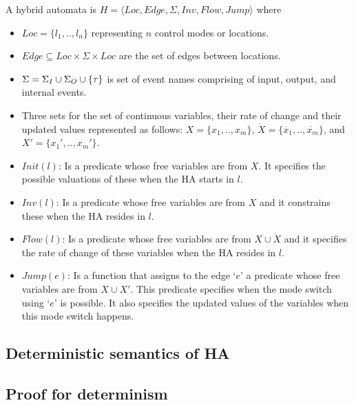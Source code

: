 \begin{definition}
	A hybrid automata is \newline 
	$H = \langle Loc, Edge, \Sigma, Inv, Flow, Jump \rangle$ where
	\begin{itemize}
		\item $Loc=\{l_1,..,l_n\}$ representing $n$ control modes or
		locations.
		\item $Edge \subseteq Loc \times \Sigma \times Loc$ are the set of
		edges between locations.
		\item $\Sigma=\Sigma_I \cup \Sigma_O \cup \{\tau\}$ is set of
		event names comprising of input, output, and internal events.
		\item Three sets for the set of continuous variables, their rate of
		change and their updated values represented as follows: \newline
		$X=\{x_1,.., x_m\}$, $\dot{X}=\{\dot{x_1},.., \dot{x_m}\}$, and \newline
		$X'=\{x_{1}',.., x_{m}'\}$.
		\item $Init(l)$: Is a predicate whose free variables are from $X$. It
		specifies the possible valuations of these when the HA starts in
		$l$.
		\item $Inv(l)$: Is a predicate whose free variables are from $X$ and
		it constrains these when the HA resides in $l$.
		\item $Flow(l)$: Is a predicate whose free variables are from
		$X \cup \dot{X}$ and it specifies the rate of change of these
		variables when the HA resides in $l$.
		\item $Jump(e)$: Is a function that assigns to the edge `$e$' a
		predicate whose free variables are from $X \cup X'$. This predicate
		specifies when the mode switch using `$e$' is possible. It also
		specifies the updated values of the variables when this mode switch
		happens.
	\end{itemize}
	\label{def:ha}
\end{definition}


\subsection{Deterministic semantics of \ac{HA}}

\subsection{Proof for determinism}